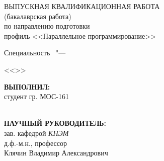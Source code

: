 %
\begin{center}
\textbf { \MakeUppercase
\thesisTitle}

{%
ВЫПУСКНАЯ КВАЛИФИКАЦИОННАЯ РАБОТА \\ (бакалаврская работа) \\ по направлению подготовки  \thesisSpecialtyNumber\ \thesisSpecialtyTitle \\ профиль <<Параллельное программирование>>
}

\ifdefined\thesisSpecialtyTwoNumber
{%
Специальность \thesisSpecialtyTwoNumber\ "---

<<\thesisSpecialtyTwoTitle>>
}
\fi

\vspace{0pt plus4fill} %

\hfill\begin{minipage}{0.55\textwidth}
			\textbf{ВЫПОЛНИЛ:} \\
			студент гр. МОС-161 \\
			\thesisAuthorLastName\ \thesisAuthorOtherNames \\
			\underline{\hspace{\textwidth}}
		\end{minipage}
%

\vspace{0pt plus1fill} %

\hfill\begin{minipage}{0.55\textwidth}
			\textbf{НАУЧНЫЙ РУКОВОДИТЕЛЬ:} \\
			зав. кафедрой \textit{КНЭМ} \\
			д.ф.-м.н., профессор \\
			Клячин Владимир Александрович \\
			\underline{\hspace{\textwidth}}
		\end{minipage}
%


\end{center}
